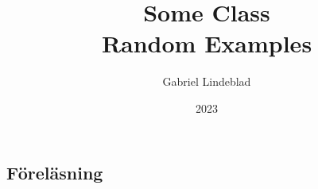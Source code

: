 \documentclass{report}
\title{\Huge{Some Class}\\Random Examples}
\author{\huge{Gabriel Lindeblad}}
\date{2023}
\begin{document}
\maketitle
\newpage
{}
\tableofcontents
\pagebreak

\chapter{}

\section{Föreläsning}
\end{document}
